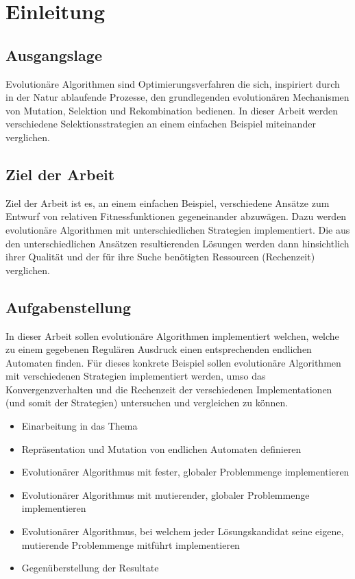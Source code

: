 \section{Einleitung}
\subsection{Ausgangslage}
Evolutionäre Algorithmen sind Optimierungsverfahren die sich, inspiriert durch in der Natur ablaufende Prozesse, den grundlegenden evolutionären Mechanismen von Mutation, Selektion und Rekombination bedienen. In dieser Arbeit werden verschiedene Selektionsstrategien an einem einfachen Beispiel miteinander verglichen.

\subsection{Ziel der Arbeit}
Ziel der Arbeit ist es, an einem einfachen Beispiel, verschiedene Ansätze zum Entwurf von relativen Fitnessfunktionen gegeneinander abzuwägen. Dazu werden evolutionäre Algorithmen mit unterschiedlichen Strategien implementiert. Die aus den unterschiedlichen Ansätzen resultierenden Lösungen werden dann hinsichtlich ihrer Qualität und der für ihre Suche benötigten Ressourcen (Rechenzeit) verglichen.

\subsection{Aufgabenstellung}
In dieser Arbeit sollen evolutionäre Algorithmen implementiert welchen, welche zu einem gegebenen Regulären Ausdruck einen entsprechenden endlichen Automaten finden. Für dieses konkrete Beispiel sollen evolutionäre Algorithmen mit verschiedenen Strategien implementiert werden, umso das Konvergenzverhalten und die Rechenzeit der verschiedenen Implementationen (und somit der Strategien) untersuchen und vergleichen zu können.
\begin{itemize}
	\item Einarbeitung in das Thema
	\item Repräsentation und Mutation von endlichen Automaten definieren 
	\item Evolutionärer Algorithmus mit fester, globaler Problemmenge implementieren 
	\item Evolutionärer Algorithmus mit mutierender, globaler Problemmenge implementieren 
	\item Evolutionärer Algorithmus, bei welchem jeder Lösungskandidat seine eigene, mutierende Problemmenge mitführt implementieren
	\item Gegenüberstellung der Resultate
\end{itemize}

